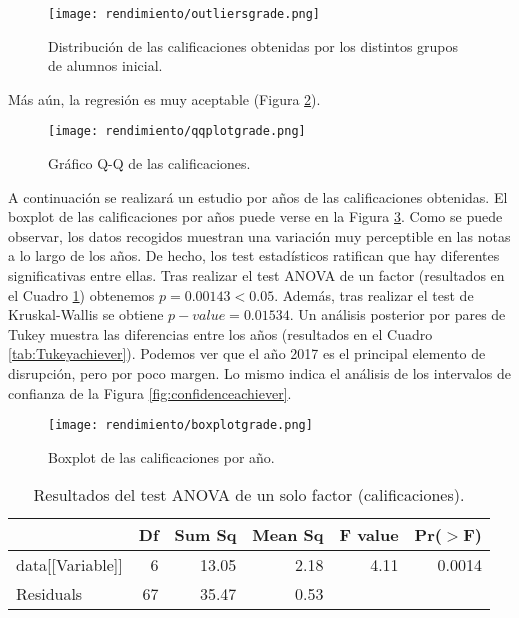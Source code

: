 \begin{figure}[H]
    \centering
    \texttt{[image: rendimiento/outliersgrade.png]}
    \caption{Distribución de las calificaciones obtenidas por los distintos grupos de alumnos inicial.}
    \label{fig:outliersgrade}
\end{figure}

Más aún, la regresión es muy aceptable (Figura \ref{fig:q-qsessionsachiever}).

\begin{figure}[H]
    \centering
    \texttt{[image: rendimiento/qqplotgrade.png]}
    \caption{Gráfico Q-Q de las calificaciones.}
    \label{fig:q-qsessionsachiever}
\end{figure}

A continuación se realizará un estudio por años de las calificaciones obtenidas. El boxplot de las calificaciones por años puede verse en la Figura \ref{fig:boxplotachieveryear}. Como se puede observar, los datos recogidos muestran una variación muy perceptible en las notas a lo largo de los años. De hecho, los test estadísticos ratifican que hay diferentes significativas entre ellas. Tras realizar el test ANOVA de un factor (resultados en el Cuadro \ref{tab:ANOVAachiever}) obtenemos $p = 0.00143 < 0.05$. Además, tras realizar el test de Kruskal-Wallis se obtiene $p-value = 0.01534$. Un análisis posterior por pares de Tukey muestra las diferencias entre los años (resultados en el Cuadro \ref{tab:Tukeyachiever}). Podemos ver que el año 2017 es el principal elemento de disrupción, pero por poco margen. Lo mismo indica el análisis de los intervalos de confianza de la Figura \ref{fig:confidenceachiever}.

\begin{figure}[H]
    \centering
    \texttt{[image: rendimiento/boxplotgrade.png]}
    \caption{Boxplot de las calificaciones por año.}
    \label{fig:boxplotachieveryear}
\end{figure}

\begin{table}[H]
\centering
\caption{Resultados del test ANOVA de un solo factor (calificaciones).}
\label{tab:ANOVAachiever}
\centering
\begin{tabular}{lrrrrr}
  \hline
 & Df & Sum Sq & Mean Sq & F value & Pr($>$F) \\ 
  \hline
data[[Variable]] & 6 & 13.05 & 2.18 & 4.11 & 0.0014 \\ 
  Residuals            & 67 & 35.47 & 0.53 &  &  \\ 
   \hline
\end{tabular}
\end{table}

